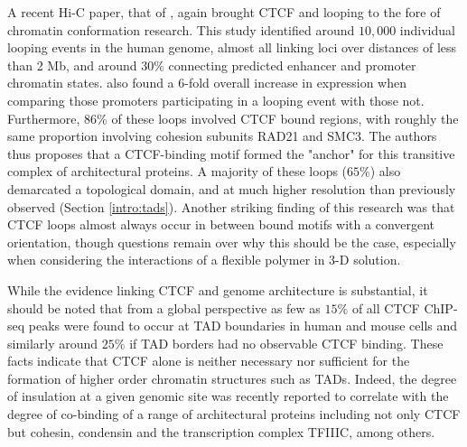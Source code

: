\documentclass[a4paper,11pt,oneside]{book}
\begin{document}
A recent Hi-C paper, that of \citet{Rao2014}, again brought CTCF and looping to the fore of chromatin conformation research. This study identified around $10,000$ individual looping events in the human genome, almost all linking loci over distances of less than 2 Mb, and around $30\%$ connecting predicted enhancer and promoter chromatin states. \citet{Rao2014} also found a 6-fold overall increase in expression when comparing those promoters participating in a looping event with those not. Furthermore, $86\%$ of these loops involved CTCF bound regions, with roughly the same proportion involving cohesion subunits RAD21 and SMC3. The authors thus proposes that a CTCF-binding motif formed the "anchor" for this transitive complex of architectural proteins.\cite{Rao2014} A majority of these loops ($65\%$) also demarcated a topological domain, and at much higher resolution than previously observed (Section \ref{intro:tads}). Another striking finding of this research was that CTCF loops almost always occur in between bound motifs with a convergent orientation,\cite{Rao2014} though questions remain over why this should be the case, especially when considering the interactions of a flexible polymer in 3-D solution.\cite{Nichols2015}


While the evidence linking CTCF and genome architecture is substantial, it should be noted that from a global perspective as few as $15\%$ of all CTCF ChIP-seq peaks were found to occur at TAD boundaries in human and mouse cells\cite{Dixon2012} and similarly around $25\%$ if TAD borders had no observable CTCF binding.\cite{Sexton2015} These facts indicate that CTCF alone is neither necessary nor sufficient for the formation of higher order chromatin structures such as TADs. Indeed, the degree of insulation at a given genomic site was recently reported to correlate with the degree of co-binding of a range of architectural proteins including not only CTCF but cohesin, condensin and the transcription complex TFIIIC, among others.\cite{VanBortle2014}

%
\end{document}
